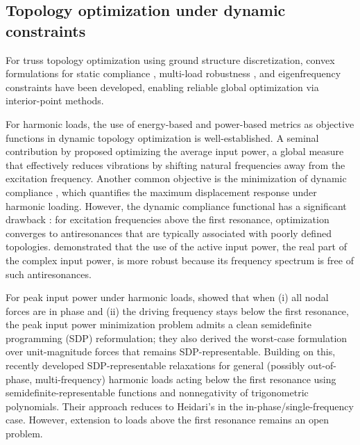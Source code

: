 \documentclass[preprint,3p]{elsarticle}
\numberwithin{equation}{section}
\begin{document}
\subsection{Topology optimization under dynamic constraints}

For truss topology optimization using ground structure discretization, convex formulations for static compliance \citep{BenTal2001}, multi-load robustness \citep{BenTal1997, Kanno2015}, and eigenfrequency constraints \citep{Achtziger2008} have been developed, enabling reliable global optimization via interior-point methods.

For harmonic loads, the use of energy-based and power-based metrics as objective functions in dynamic topology optimization is well-established. A seminal contribution by \citet{Jog2002} proposed optimizing the average input power, a global measure that effectively reduces vibrations by shifting natural frequencies away from the excitation frequency. Another common objective is the minimization of dynamic compliance \citep{Olhoff2014}, which quantifies the maximum displacement response under harmonic loading. However, the dynamic compliance functional has a significant drawback \citep{Silva2019}: for excitation frequencies above the first resonance, optimization converges to antiresonances that are typically associated with poorly defined topologies. \citet{Silva2020} demonstrated that the use of the active input power, the real part of the complex input power, is more robust because its frequency spectrum is free of such antiresonances.

For peak input power under harmonic loads, \citet{Heidari2009optimization} showed that when (i) all nodal forces are in phase and (ii) the driving frequency stays below the first resonance, the peak input power minimization problem admits a clean semidefinite programming (SDP) reformulation; they also derived the worst-case formulation over unit-magnitude forces that remains SDP-representable. Building on this, \citet{Ma2025} recently developed SDP-representable relaxations for general (possibly out-of-phase, multi-frequency) harmonic loads acting below the first resonance using semidefinite-representable functions and nonnegativity of trigonometric polynomials. Their approach reduces to Heidari's in the in-phase/single-frequency case. However, extension to loads above the first resonance remains an open problem.
\end{document}
